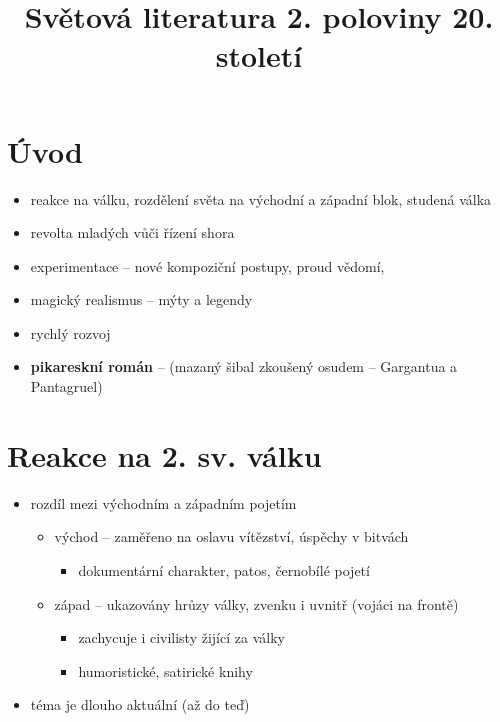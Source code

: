\title{Světová literatura 2. poloviny 20. století}



\section{Úvod}
\begin{itemize}
\item reakce na válku, rozdělení světa na východní a západní blok, studená válka
\item revolta mladých vůči řízení shora
\item experimentace -- nové kompoziční postupy, proud vědomí, 
\item magický realismus -- mýty a legendy
\item rychlý rozvoj 
\item \textbf{pikareskní román} -- (mazaný šibal zkoušený osudem -- Gargantua a Pantagruel)
\end{itemize}

\section{Reakce na 2. sv. válku}
\begin{itemize}
\item rozdíl mezi východním a západním pojetím
	\begin{itemize}
	\item východ -- zaměřeno na oslavu vítězství, úspěchy v bitvách
		\begin{itemize}
		\item dokumentární charakter, patos, černobílé pojetí
		\end{itemize}
	\item západ -- ukazovány hrůzy války, zvenku i uvnitř (vojáci na frontě)
		\begin{itemize}
		\item zachycuje i civilisty žijící za války
		\item humoristické, satirické knihy
		\end{itemize}
	\end{itemize}
\item téma je dlouho aktuální (až do teď)
\end{itemize}

